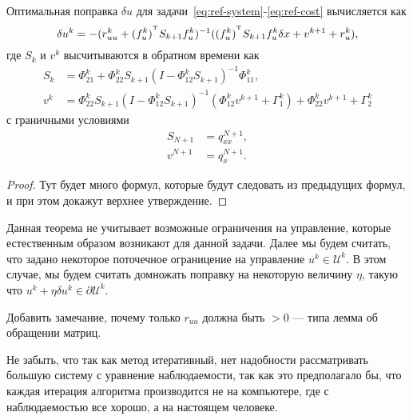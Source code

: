 \begin{theorem}
    Оптимальная поправка $\delta u$ для задачи~\eqref{eq:ref-system}-\eqref{eq:ref-cost} вычисляется как
    \begin{equation}
        \delta u^k = - (r^k_{uu} + (f^k_u)^{^\mathrm{T}} S_{k+1} f^k_u)^{-1} ((f^k_u)^{^\mathrm{T}} S_{k+1} f^k_u \delta x + v^{k+1} + r^k_u),
    \end{equation}
    где $S_k$ и $v^{k}$ высчитываются в обратном времени как
    \begin{equation}
        \begin{aligned}
            S_k &= \Phi^k_{21} + \Phi^k_{22} S_{k+1} (I - \Phi^k_{12}S_{k+1})^{-1} \Phi^k_{11},
            \\
            v^k &= \Phi^k_{22} S_{k+1} ( I - \Phi^k_{12} S_{k+1})^{-1} (\Phi^k_{12} v^{k+1} + \Gamma^k_1) + \Phi^k_{22} v^{k+1} + \Gamma^k_2
        \end{aligned}
    \end{equation}
    с граничными условиями
    \begin{equation}
        \begin{aligned}
            S_{N+1} &= q^{N+1}_{xx},
            \\
            v^{N+1} &= q^{N+1}_{x}.
        \end{aligned}
    \end{equation}
\end{theorem}
\begin{proof}
    
    Тут будет много формул, которые будут следовать из предыдущих формул, и при этом докажут верхнее утверждение.

\end{proof}
\begin{remark}
    Данная теорема не учитывает возможные ограничения на управление, которые естественным образом возникают для данной задачи.
    Далее мы будем считать, что задано некоторое поточечное ограницение на управление $u^k \in \mathcal{U}^k$.
    В этом случае, мы будем считать домножать поправку на некоторую величину $\eta$, такую что $u^k + \eta \delta u^k \in \partial \mathcal{U}^k$.
\end{remark}

{\color{red} Добавить замечание, почему только $r_{uu}$ должна быть $> 0$ --- типа лемма об обращении матриц.}

{\color{red} Не забыть, что так как метод итеративный, нет надобности рассматривать большую систему с уравнение наблюдаемости, так как это предполагало бы, что каждая итерация алгоритма производится не на компьютере, где с наблюдаемостью все хорошо, а на настоящем человеке.}


